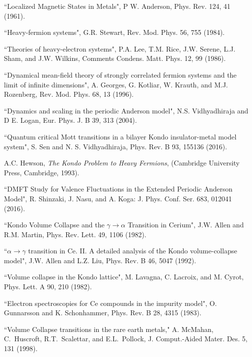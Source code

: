 \documentclass[pra,letterpaper,10pt,twocolumn]{revtex4}
\begin{document}
\begin{thebibliography}{100}

``Localized Magnetic States in Metals",
P W. Anderson, Phys. Rev. 124, 41 (1961).

``Heavy-fermion systems",
G.R. Stewart, Rev. Mod. Phys. 56, 755 (1984).

``Theories of heavy-electron systems",
P.A. Lee, T.M. Rice, J.W. Serene, L.J. Sham, and J.W. Wilkins,
Comments Condens. Matt. Phys. 12, 99 (1986).

``Dynamical mean-field theory of strongly correlated fermion systems and the limit of infinite dimensions",
A. Georges, G. Kotliar, W. Krauth, and M.J. Rozenberg, 
Rev. Mod. Phys. 68, 13 (1996).
 
``Dynamics and scaling in the periodic Anderson model",
N.S. Vidhyadhiraja and D E. Logan, Eur. Phys. J. B 39, 313 (2004). 

``Quantum critical Mott transitions in a bilayer Kondo insulator-metal model system",
S. Sen and N. S. Vidhyadhiraja, Phys. Rev. B 93, 155136 (2016).

A.C. Hewson, {\it The Kondo Problem to Heavy Fermions},
(Cambridge University Press, Cambridge, 1993).

``DMFT Study for Valence Fluctuations in the Extended Periodic Anderson Model",
R. Shinzaki, J. Nasu, and A. Koga: J. Phys. Conf. Ser. 683, 012041 (2016).

``Kondo Volume Collapse and the $\gamma\rightarrow\alpha$ Transition in Cerium",
J.W. Allen and R.M. Martin,
Phys. Rev. Lett. 49, 1106 (1982).

``$\alpha \rightarrow \gamma$ transition in Ce. II. A detailed analysis
of the Kondo volume-collapse model", J.W. Allen and L.Z. Liu, Phys. Rev.
B 46, 5047 (1992).

``Volume collapse in the Kondo lattice",
M. Lavagna, C. Lacroix, and M. Cyrot,
Phys. Lett. A 90, 210 (1982).

``Electron spectroscopies for Ce compounds in the impurity model",
O. Gunnarsson and K. Schonhammer,
Phys. Rev. B 28, 4315 (1983).

``Volume Collapse transitions in the rare earth metals,"
A. McMahan, C.~Huscroft, R.T.~Scalettar, and E.L.~Pollock,
J. Comput.-Aided Mater. Des. 5, 131 (1998).


\end{thebibliography}
\end{document}
